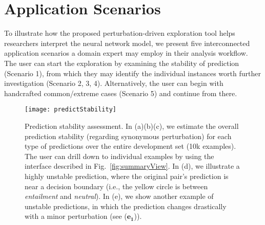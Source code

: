 \section{Application Scenarios}
\label{sec:caseStudy}
To illustrate how the proposed perturbation-driven exploration tool helps researchers interpret the neural network model,
we present five interconnected application scenarios a domain expert may employ in their analysis workflow.
The user can start the exploration by examining the stability of prediction (Scenario 1), from which they may identify the individual instances worth further investigation (Scenario 2, 3, 4). Alternatively, the user can begin with handcrafted common/extreme cases (Scenario 5) and continue from there.

\begin{figure}[htbp]
\centering
\vspace{-2mm}
 \texttt{[image: predictStability]}
 \vspace{-6mm}
 \caption{
Prediction stability assessment. In (a)(b)(c), we estimate the overall prediction stability (regarding synonymous perturbation) for each type of predictions over the entire development set (10k examples). The user can drill down to individual examples by using the interface described in Fig.~\ref{fig:summaryView}. In (d), we illustrate a highly unstable prediction, where the original pair's prediction is near a decision boundary (i.e., the yellow circle is between \emph{entailment} and \emph{neutral}). In (e), we show another example of unstable predictions, in which the prediction changes drastically with a minor perturbation (see ($\mathbf{e_1}$)). }
\label{fig:predictStability}
\vspace{-3mm}
\end{figure}

